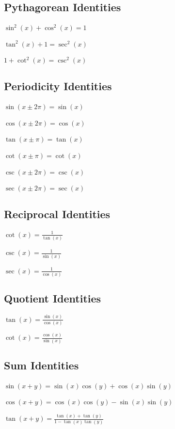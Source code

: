 \documentclass[8pt,a4paper]{extarticle}     %
\theoremstyle{definition}
\theoremstyle{definition}
\theoremstyle{definition}
\begin{document}
\begin{multicols}{4}
\subsection{Pythagorean Identities}	
\begin{eqlist}
	\item $\sin^2(x) + \cos^2(x) = 1$
	\item $\tan^2(x) + 1 = \sec^2(x)$
	\item $1 + \cot^2(x) = \csc^2(x)$
\end{eqlist}

\subsection{Periodicity Identities}
\begin{eqlist}
	\item $\sin(x \pm 2\pi) = \sin(x)$
	\item $\cos(x \pm 2\pi) = \cos(x)$
	\item $\tan(x \pm \pi) = \tan(x)$
	\item $\cot(x \pm \pi) = \cot(x)$
	\item $\csc(x \pm 2\pi) = \csc(x)$
	\item $\sec(x \pm 2\pi) = \sec(x)$
\end{eqlist}

\subsection{Reciprocal Identities}	
\begin{eqlist}
	\item $\cot(x) = \frac{1}{\tan(x)}$
	\item $\csc(x) = \frac{1}{\sin(x)}$
	\item $\sec(x) = \frac{1}{\cos(x)}$
\end{eqlist}

\subsection{Quotient Identities}	
\begin{eqlist}
	\item $\tan(x) = \frac{\sin(x)}{\cos(x)}$
	\item $\cot(x) = \frac{\cos(x)}{\sin(x)}$
\end{eqlist}

\subsection{Sum Identities}	
\begin{eqlist}
	\item $\sin(x + y) = \sin(x)\cos(y) + \cos(x)\sin(y)$
	\item $\cos(x + y) = \cos(x)\cos(y) - \sin(x)\sin(y)$
	\item $\tan(x + y) = \frac{\tan(x) + \tan(y)}{1-\tan(x)\tan(y)}$
\end{eqlist}


\end{multicols}
\end{document}

